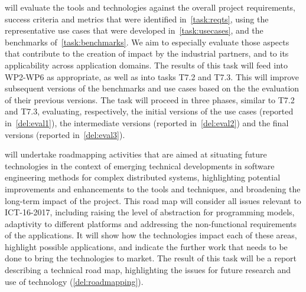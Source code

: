 \begin{Workpackage}{\thewpno}
\begin{Task}
\theTask{} will evaluate the \TheProject{} tools and technologies
against the overall project requirements, success criteria and metrics that were identified
in~\ref{task:reqts},
using the
representative use cases that were developed
in~\ref{task:usecases},
and the benchmarks of~\ref{task:benchmarks}.
%
We aim to especially evaluate those aspects that contribute to the creation of impact
by the industrial partners, and to its applicability across application domains. The results
of this task will feed into WP2-WP6 as appropriate, as well as into tasks T7.2 and T7.3.
This will improve subsequent versions of the benchmarks and use cases based on the the evaluation of their
previous versions. The task will proceed in three phases, similar to T7.2 and T7.3, evaluating, respectively,
the initial versions of the use cases (reported in~\ref{del:eval1}), the intermediate versions (reported in~\ref{del:eval2}) and the final versions (reported in~\ref{del:eval3}).

\end{Task}


\begin{Task}


\TaskResults{}

\TaskHeader{}

\theTask{} will undertake roadmapping activities that are aimed at situating future 
\TheProject{} technologies in the context of emerging technical developments 
in software engineering methods for complex distributed systems, highlighting potential improvements and 
enhancements to the \TheProject{} tools and techniques, and broadening the long-term impact of the \TheProject{} project. 
This road map will consider
all issues relevant to ICT-16-2017, including raising the level of abstraction for programming models,
adaptivity to different platforms and addressing the non-functional requirements of the applications.
It will show how the \TheProject{} technologies
impact each of these areas, highlight possible applications, and indicate the further work that needs to be done
to bring the \TheProject{} technologies to market.
The result of this task will be a report describing a technical road map,
highlighting the issues for future research and use of \TheProject{}
technology (\ref{del:roadmapping}).


\end{Task}
\end{Workpackage}
